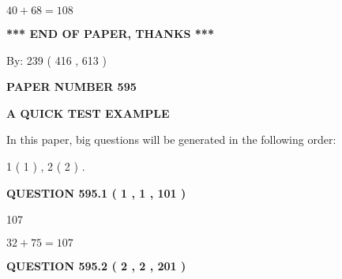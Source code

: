 \documentclass[12pt]{article}
\begin{document}
$ %
40 +  %
68=   %
108$
 
 
   
   
 \vspace{0.2in}
 
   
   
   
   
\vspace{1.0in} 
{\textbf{\large{ *** END OF PAPER, THANKS *** }}} 
   
   
\hspace{1.0in} By: 
 239 ( 416 ,  613 )
   
   
   
   
\newpage 
\setcounter{page}{ 
   595001 } 
   
   
   
   
 {\textbf{ \Large{ PAPER NUMBER  595  }}}
   
   
\vspace{0.2in}
   
   
   
   
   
   
 \vspace{0.2in}
{\LARGE {\textbf{ A QUICK TEST EXAMPLE}}}
   
   
   
\vspace{0.2in}
   
In this paper, big questions will be generated in the following order: 
   
   
   1 ( 1 )
 ,
   2 ( 2 )
 .
  
\vspace{0.2in}
  
{\textbf{\Large{QUESTION
595.1 
 ( 1 , 1 , 101 )
}}}
  
  
 
 
\noindent{}

107
 
 
 
 
\noindent{}

$ %
32 +  %
75=   %
107$
 
 
  
\vspace{0.2in}
  
{\textbf{\Large{QUESTION
595.2 
 ( 2 , 2 , 201 )
}}}
  
\end{document}
